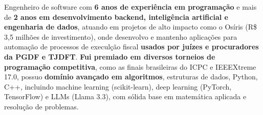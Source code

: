 \documentclass[a4paper,12pt]{article}
\begin{document}

Engenheiro de software com  \textbf{6 anos de experiência em programação} e mais de \textbf{2 anos em desenvolvimento backend,
inteligência artificial e engenharia de dados}, atuando em projetos de alto impacto como o Osíris (R\$ 3,5 milhões de investimento),
onde desenvolvo e mantenho aplicações para automação de processos de execulção fiscal \textbf{usados por juízes e procuradores da PGDF e TJDFT}.
\textbf{Fui premiado em diversos torneios de programação competitiva}, como as finais brasileiras do ICPC e IEEEXtreme 17.0,
possuo \textbf{domínio avançado em algoritmos}, estruturas de dados, Python, C++, incluindo machine learning (scikit-learn),
deep learning (PyTorch, TensorFlow) e LLMs (Llama 3.3), com sólida base em matemática aplicada e resolução de problemas.
\end{document}
